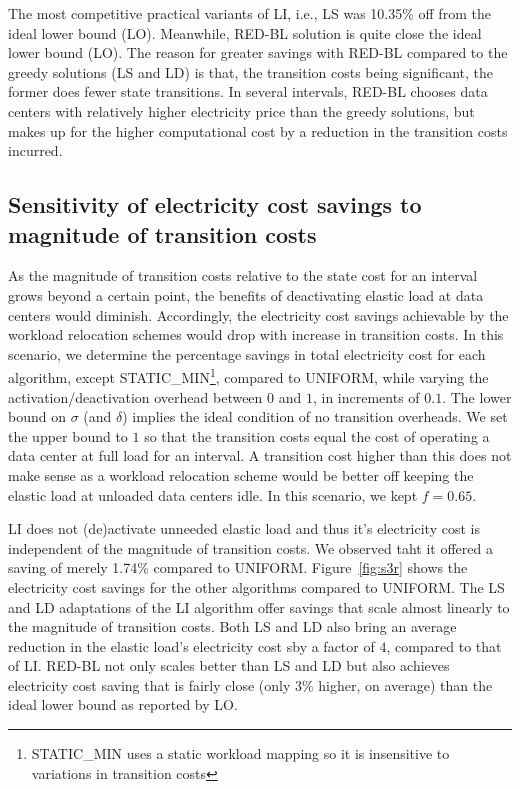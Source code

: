 The most competitive practical variants of LI, i.e., LS was 10.35\% off from the ideal lower bound (LO). Meanwhile, RED-BL solution is quite close the ideal lower bound (LO). The reason for greater savings with RED-BL compared to the greedy solutions (LS and LD) is that, the transition costs being significant, the former does fewer state transitions. In several intervals, RED-BL chooses data centers with relatively higher electricity price than the greedy solutions, but makes up for the higher computational cost by a reduction in the transition costs incurred.

\subsection{Sensitivity of electricity cost savings to magnitude of transition costs}
As the magnitude of transition costs relative to the state cost for an interval grows beyond a certain point, the benefits of deactivating elastic load at data centers would diminish. Accordingly, the electricity cost savings achievable by the workload relocation schemes would drop with increase in transition costs. In this scenario, we determine the percentage savings in total
    electricity cost for each algorithm, except
    STATIC\_MIN\footnote{STATIC\_MIN uses a static workload mapping so it is insensitive to variations in transition costs}, compared to UNIFORM, while varying the activation/deactivation overhead
    between $0$ and $1$, in increments of
    $0.1$. The lower bound on $\sigma$ (and $\delta$)
    implies the ideal condition of no transition overheads.
    We set the upper bound to $1$ so that the
    transition costs equal the cost of operating a data
    center at full load for an interval. A transition cost
    higher than this does not make sense as a workload relocation scheme would be better off keeping the elastic load at unloaded data centers idle. In this scenario,
    we kept $f=0.65$.

LI does not (de)activate unneeded elastic load and thus it's electricity cost is independent of the magnitude of transition costs. We observed taht it offered a saving of merely 1.74\% compared to UNIFORM. Figure~\ref{fig:s3r} shows the electricity cost savings for the other algorithms compared to UNIFORM. The LS and LD adaptations of the LI algorithm offer savings that scale almost linearly to the magnitude of transition costs. Both LS and LD also bring an average reduction in the elastic load's electricity cost sby a factor of $4$, compared to that of LI. RED-BL not only scales better than LS and LD but also achieves electricity cost saving that is fairly close (only $3\%$ higher, on average) than the ideal lower bound as reported by LO.


